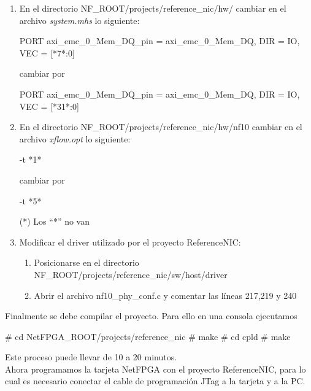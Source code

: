 \begin{enumerate}

\item En el directorio NF\_ROOT/projects/reference\_nic/hw/ cambiar en el archivo \textit{system.mhs} lo siguiente:

\begin{bash}
PORT axi_emc_0_Mem_DQ_pin = axi_emc_0_Mem_DQ, DIR = IO, 
VEC = [*7*:0]
\end{bash}

cambiar por

\begin{bash}
PORT axi_emc_0_Mem_DQ_pin = axi_emc_0_Mem_DQ, DIR = IO, 
VEC = [*31*:0]
\end{bash}

\item En el directorio NF\_ROOT/projects/reference\_nic/hw/nf10 cambiar en el archivo \textit{xflow.opt} lo siguiente: 

\begin{bash}
-t *1*
\end{bash}

cambiar por

\begin{bash}
-t *5*
\end{bash}

(*) Los “*” no van

\item Modificar el driver utilizado por el proyecto ReferenceNIC:
\begin{enumerate}
\item Posicionarse en el directorio NF\_ROOT/projects/reference\_nic/sw/host/driver
\item Abrir el archivo nf10\_phy\_conf.c y comentar las líneas 217,219 y 240
\end{enumerate}

\end{enumerate}

Finalmente se debe compilar el proyecto. Para ello en una consola ejecutamos

\begin{bash}
# cd NetFPGA_ROOT/projects/reference_nic
# make
# cd cpld
# make
\end{bash}

Este proceso puede llevar de 10 a 20 minutos.\\

Ahora programamos la tarjeta NetFPGA con el proyecto ReferenceNIC, para lo cual es necesario conectar el cable de programación JTag a la tarjeta y a la PC.\\

